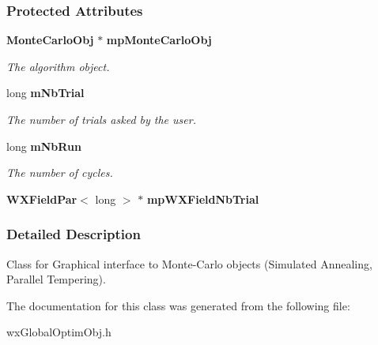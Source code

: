 \subsubsection*{Protected Attributes}
\begin{DoxyCompactItemize}
\item 
{\bf MonteCarloObj} $\ast$ {\bf mpMonteCarloObj}\label{a00132_aabf6054ded526d3420f94f15e4041c96}

\begin{DoxyCompactList}\small\item\em The algorithm object. \item\end{DoxyCompactList}\item 
long {\bf mNbTrial}\label{a00132_ae94ccb980fabf593aabe68c6c824f110}

\begin{DoxyCompactList}\small\item\em The number of trials asked by the user. \item\end{DoxyCompactList}\item 
long {\bf mNbRun}\label{a00132_a60b17ba417b67f8c621b5b714d68e3b0}

\begin{DoxyCompactList}\small\item\em The number of cycles. \item\end{DoxyCompactList}\item 
{\bf WXFieldPar}$<$ long $>$ $\ast$ {\bfseries mpWXFieldNbTrial}\label{a00132_a33e32f028bdeb510fbd9885eeafab809}

\end{DoxyCompactItemize}


\subsubsection{Detailed Description}
Class for Graphical interface to Monte-\/Carlo objects (Simulated Annealing, Parallel Tempering). 

The documentation for this class was generated from the following file:\begin{DoxyCompactItemize}
\item 
wxGlobalOptimObj.h\end{DoxyCompactItemize}
